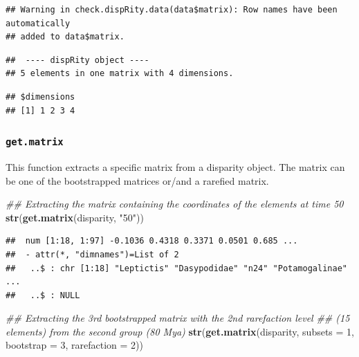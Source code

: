 \documentclass[
]{book}
\newenvironment{Shaded}{\begin{snugshade}}{\end{snugshade}}
\newcommand{\CommentTok}[1]{\textcolor[rgb]{0.56,0.35,0.01}{\textit{#1}}}
\newcommand{\DataTypeTok}[1]{\textcolor[rgb]{0.13,0.29,0.53}{#1}}
\newcommand{\DecValTok}[1]{\textcolor[rgb]{0.00,0.00,0.81}{#1}}
\newcommand{\KeywordTok}[1]{\textcolor[rgb]{0.13,0.29,0.53}{\textbf{#1}}}
\newcommand{\NormalTok}[1]{#1}
\newcommand{\OperatorTok}[1]{\textcolor[rgb]{0.81,0.36,0.00}{\textbf{#1}}}
\newcommand{\StringTok}[1]{\textcolor[rgb]{0.31,0.60,0.02}{#1}}
\begin{document}
\begin{verbatim}
## Warning in check.dispRity.data(data$matrix): Row names have been automatically
## added to data$matrix.
\end{verbatim}

\begin{verbatim}
##  ---- dispRity object ---- 
## 5 elements in one matrix with 4 dimensions.
\end{verbatim}

\begin{Shaded}
\end{Shaded}

\begin{verbatim}
## $dimensions
## [1] 1 2 3 4
\end{verbatim}

\hypertarget{get.matrix}{%
\subsubsection{\texorpdfstring{\texttt{get.matrix}}{get.matrix}}\label{get.matrix}}

This function extracts a specific matrix from a disparity object.
The matrix can be one of the bootstrapped matrices or/and a rarefied matrix.

\begin{Shaded}
\begin{Highlighting}[]
\CommentTok{\#\# Extracting the matrix containing the coordinates of the elements at time 50}
\KeywordTok{str}\NormalTok{(}\KeywordTok{get.matrix}\NormalTok{(disparity, }\StringTok{"50"}\NormalTok{))}
\end{Highlighting}
\end{Shaded}

\begin{verbatim}
##  num [1:18, 1:97] -0.1036 0.4318 0.3371 0.0501 0.685 ...
##  - attr(*, "dimnames")=List of 2
##   ..$ : chr [1:18] "Leptictis" "Dasypodidae" "n24" "Potamogalinae" ...
##   ..$ : NULL
\end{verbatim}

\begin{Shaded}
\begin{Highlighting}[]
\CommentTok{\#\# Extracting the 3rd bootstrapped matrix with the 2nd rarefaction level}
\CommentTok{\#\# (15 elements) from the second group (80 Mya)}
\KeywordTok{str}\NormalTok{(}\KeywordTok{get.matrix}\NormalTok{(disparity, }\DataTypeTok{subsets =} \DecValTok{1}\NormalTok{, }\DataTypeTok{bootstrap =} \DecValTok{3}\NormalTok{, }\DataTypeTok{rarefaction =} \DecValTok{2}\NormalTok{))}
\end{Highlighting}
\end{Shaded}
\end{document}
